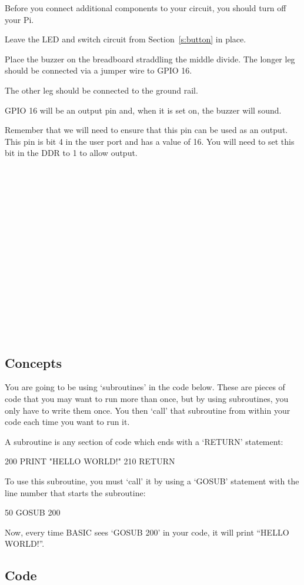 
Before you connect additional components to your circuit, you should turn off your Pi.

Leave the LED and switch circuit from Section~\ref{s:button} in place.

Place the buzzer on the breadboard straddling the middle divide.  The longer leg should be connected via a jumper wire to GPIO 16.

The other leg should be connected to the ground rail.

GPIO 16 will be an output pin and, when it is set on, the buzzer will sound.

Remember that we will need to ensure that this pin can be used as an output.  This pin is bit 4 in the user port and has a value of 16.  You will need to set this bit in the DDR to 1 to allow output.

~\hfill

~\hfill

~\hfill

~\hfill

~\hfill

~\hfill

~\hfill

~\hfill

~\hfill

\subsection*{Concepts}

You are going to be using `subroutines' in the code below.  These are pieces of code that you may want to run more than once, but by using subroutines, you only have to write them once.  You then `call' that subroutine from within your code each time you want to run it.

A subroutine is any section of code which ends with a `RETURN' statement:
\begin{basic}
200 PRINT "HELLO WORLD!"
210 RETURN
\end{basic}

To use this subroutine, you must `call' it by using a `GOSUB' statement with the line number that starts the subroutine:
\begin{basic}
50 GOSUB 200
\end{basic}

Now, every time BASIC sees `GOSUB 200' in your code, it will print ``HELLO WORLD!''.

\subsection*{Code}


